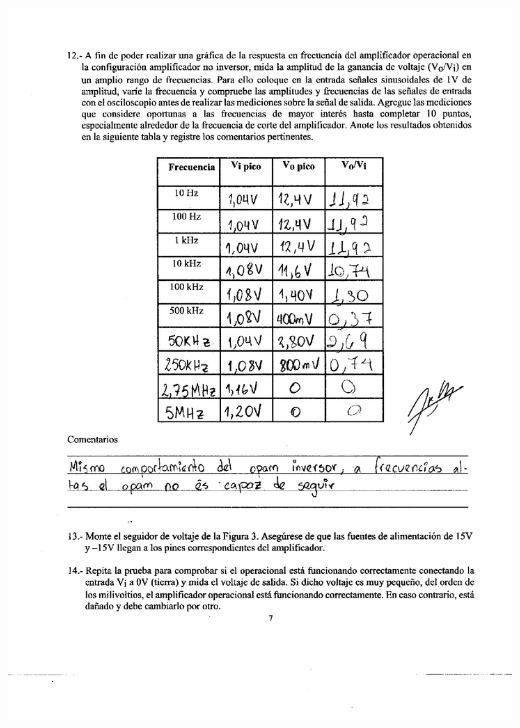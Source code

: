 \documentclass[12pt]{article}
\begin{document}
	\includegraphics[width=16cm,height=21cm]{Img/lab_9_page-0004}\\
\end{document}
